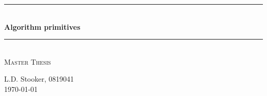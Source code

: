 \documentclass[a4paper,10pt]{article}
\begin{document}
\begin{titlepage}

\newcommand{\HRule}{\rule{\linewidth}{0.5mm}} %

\center %

\HRule \\[0.4cm]
{ \Huge \bfseries Algorithm primitives}\\[0.4cm] %
\HRule \\[1.5cm]


\textsc{\large Master Thesis}\\[1.0cm] %


\vfill %

L.D. Stooker, 0819041 \\ [1cm]



{\large \today}\\[3cm] %






\end{titlepage}
\end{document}
